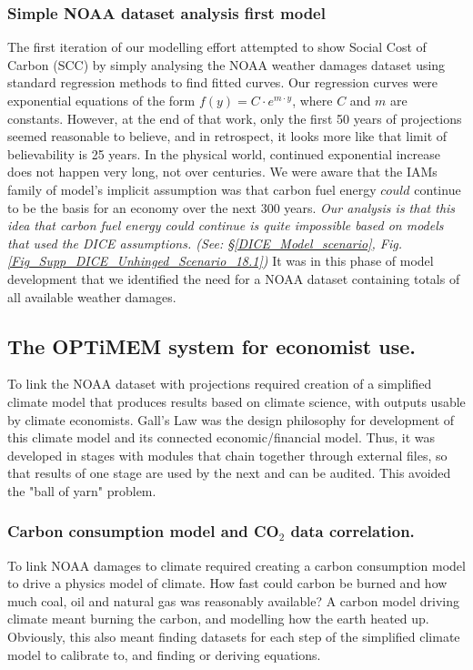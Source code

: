 \documentclass{article}
\begin{document}
\subsubsection{Simple NOAA dataset analysis first model} The first iteration of our modelling effort attempted to show Social Cost of Carbon (SCC) by simply analysing the NOAA weather damages dataset using standard regression methods to find fitted curves. Our  regression curves were exponential equations of the form $f(y)= C \cdot e^{m \cdot y}$, where $C$ and $m$ are constants. However, at the end of that work, only the first 50 years of projections seemed reasonable to believe, and in retrospect, it looks more like that limit of believability is 25 years. In the physical world, continued exponential increase does not happen very long, not over centuries. We were aware that the IAMs family of model's implicit assumption was that carbon fuel energy $could$ continue to be the basis for an economy over the next 300 years. \emph{Our analysis is that this idea that carbon fuel energy could continue is quite impossible based on models that used the DICE assumptions. (See: \S \ref{DICE_Model_scenario}, Fig. \ref{Fig_Supp_DICE_Unhinged_Scenario_18.1})} It was in this phase of model development that we identified the need for a NOAA dataset containing totals of all available weather damages.   

\subsection{The OPTiMEM system for economist use.} 
To link the NOAA dataset with projections required creation of a simplified climate model that produces results based on climate science, with outputs usable by climate economists. Gall's Law was the design philosophy for development of this climate model and its connected economic/financial model. Thus, it was developed in stages with modules that chain together through external files, so that results of one stage are used by the next \cite{Gall1986Systemantics} and can be audited. This avoided the "ball of yarn" problem.  

\subsubsection{Carbon consumption model and CO$_2$ data correlation.} To link NOAA damages to climate required creating a carbon consumption model to drive a physics model of climate. How fast could carbon be burned and how much coal, oil and natural gas was reasonably available? A carbon model driving climate meant burning the carbon, and modelling how the earth heated up. Obviously, this also meant finding datasets for each step of the simplified climate model to calibrate to, and finding or deriving equations. 
\end{document}
